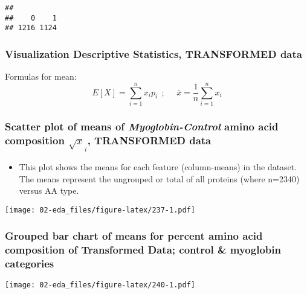 \documentclass[]{article}
\providecommand{\tightlist}{%
  \setlength{\itemsep}{0pt}\setlength{\parskip}{0pt}}
\begin{document}
\begin{verbatim}
## 
##    0    1 
## 1216 1124
\end{verbatim}

\hypertarget{visualization-descriptive-statistics-transformed-data}{%
\subsubsection{Visualization Descriptive Statistics, TRANSFORMED
data}\label{visualization-descriptive-statistics-transformed-data}}

Formulas for mean: \begin{equation} 
E[X] = \sum_{i=1}^n x_i p_i ~~; ~~~~~~ \bar x = \frac {1}{n} \sum_{i=1}^n x_i
\end{equation}

\hypertarget{scatter-plot-of-means-of-myoglobin-control-amino-acid-composition-sqrt-x_i-transformed-data}{%
\subsubsection{\texorpdfstring{Scatter plot of means of
\emph{Myoglobin-Control} amino acid composition \(\sqrt x_i\),
TRANSFORMED
data}{Scatter plot of means of Myoglobin-Control amino acid composition \textbackslash{}sqrt x\_i, TRANSFORMED data}}\label{scatter-plot-of-means-of-myoglobin-control-amino-acid-composition-sqrt-x_i-transformed-data}}

\begin{itemize}
\tightlist
\item
  This plot shows the means for each feature (column-means) in the
  dataset. The means represent the ungrouped or total of all proteins
  (where n=2340) versus AA type.
\end{itemize}

\texttt{[image: 02-eda\_files/figure-latex/237-1.pdf]}

\hypertarget{grouped-bar-chart-of-means-for-percent-amino-acid-composition-of-transformed-data-control-myoglobin-categories}{%
\subsubsection{Grouped bar chart of means for percent amino acid
composition of Transformed Data; control \& myoglobin
categories}\label{grouped-bar-chart-of-means-for-percent-amino-acid-composition-of-transformed-data-control-myoglobin-categories}}

\texttt{[image: 02-eda\_files/figure-latex/240-1.pdf]}
\end{document}
